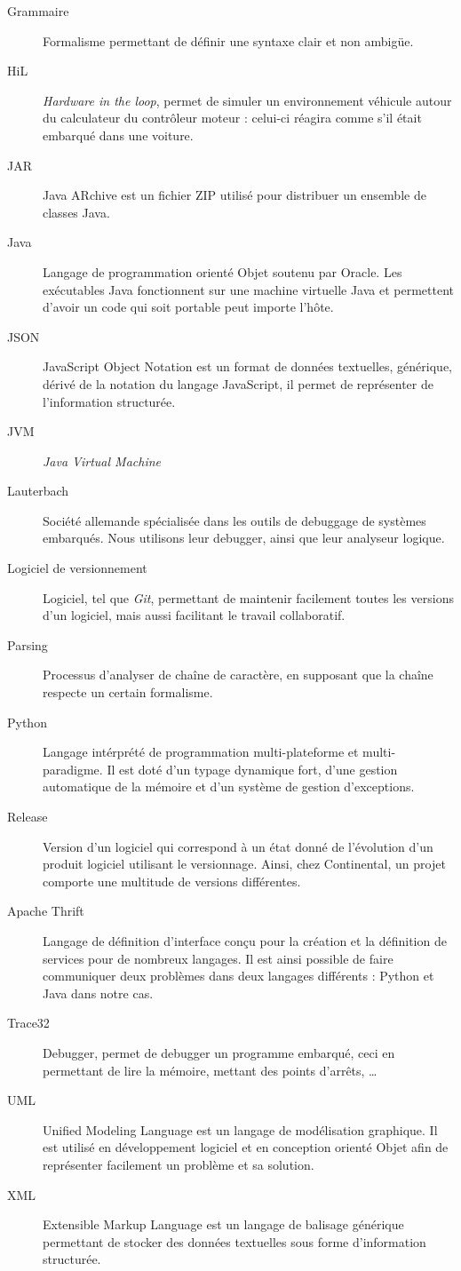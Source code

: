 \begin{description}
\item[Grammaire] Formalisme permettant de définir une syntaxe clair et non ambigüe.
\item[HiL] \textit{Hardware in the loop}, permet de simuler un environnement véhicule autour du calculateur du contrôleur moteur : celui-ci réagira comme s'il était embarqué dans une voiture.
\item[JAR] Java ARchive est un fichier ZIP utilisé pour distribuer un ensemble de classes Java.
\item[Java] Langage de programmation orienté Objet soutenu par Oracle. Les exécutables Java fonctionnent sur une machine virtuelle Java et permettent d'avoir un
	code qui soit portable peut importe l'hôte.
\item[JSON] JavaScript Object Notation est un format de données textuelles, générique, dérivé de la notation du langage JavaScript, il permet de représenter de
	l'information structurée.
\item[JVM] \textit{Java Virtual Machine}
\item[Lauterbach] Société allemande spécialisée dans les outils de debuggage de systèmes embarqués. Nous utilisons leur debugger, ainsi que leur analyseur logique.
\item[Logiciel de versionnement] Logiciel, tel que \textit{Git}, permettant de maintenir facilement toutes les versions d'un logiciel, mais aussi facilitant le
	travail collaboratif.
\item[Parsing] Processus d'analyser de chaîne de caractère, en supposant que la chaîne respecte un certain formalisme. 
\item[Python] Langage intérprété de programmation multi-plateforme et multi-paradigme. Il est doté d'un typage dynamique fort, d'une gestion automatique de la mémoire et d'un système de gestion d'exceptions. 
\item[Release] Version d'un logiciel qui correspond à un état donné de l'évolution d'un produit logiciel utilisant le versionnage. Ainsi, chez Continental, un projet comporte une multitude de versions différentes.
\item[Apache Thrift] Langage de définition d'interface conçu pour la création et la définition de services pour de nombreux langages. Il est ainsi possible de
	faire communiquer deux problèmes dans deux langages différents : Python et Java dans notre cas.
\item[Trace32] Debugger, permet de debugger un programme embarqué, ceci en permettant de lire la mémoire, mettant des points d'arrêts, \ldots
\item[UML] Unified Modeling Language est un langage de modélisation graphique. Il est utilisé en développement logiciel et en conception orienté Objet afin de
	représenter facilement un problème et sa solution.
\item[XML] Extensible Markup Language est un langage de balisage générique permettant de stocker des données textuelles sous forme d'information structurée.
\end{description}

